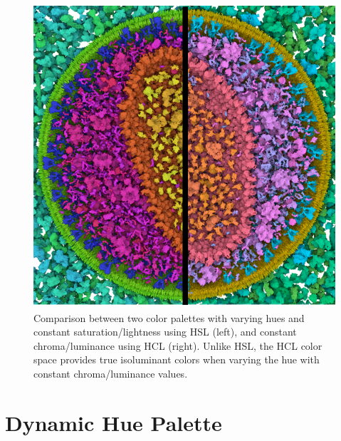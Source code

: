 \documentclass{egpubl}
\begin{document}
		
	\begin{figure}[t]
		\centering
		\includegraphics[width=0.75\linewidth]{Figures/hslvshcl}
		\caption{Comparison between two color palettes with varying hues and constant saturation/lightness using HSL (left), and constant chroma/luminance using HCL (right). 
		Unlike HSL, the HCL color space provides true isoluminant colors when varying the hue with constant chroma/luminance values.
		 }
		\label{fig:hslvshcl}
	\end{figure}
	
	
	
		
		
		
		
	
	
	\section{Dynamic Hue Palette}
	\label{sec:hue}
	
\end{document}

